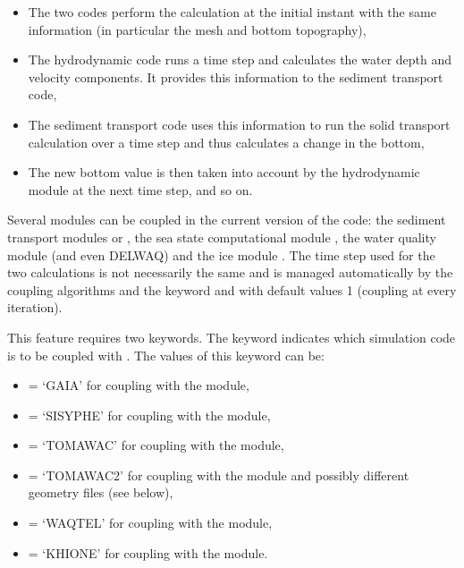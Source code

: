 \begin{itemize}
\item The two codes perform the calculation at the initial instant
with the same information (in particular the mesh and bottom topography),

\item The hydrodynamic code runs a time step and calculates the water depth
and velocity components.
It provides this information to the sediment transport code,

\item The sediment transport code uses this information to run the solid
transport calculation over a time step and thus calculates a change in the
bottom,

\item The new bottom value is then taken into account by the hydrodynamic module
at the next time step, and so on.
\end{itemize}

Several modules can be coupled in the current version of the code:
the sediment transport modules \gaia or \sisyphe,
the sea state computational module \tomawac,
the water quality module \waqtel (and even DELWAQ)
and the ice module \khione.
The time step used for the two calculations is not necessarily the same and is
managed automatically by the coupling algorithms
and the keyword  and
 with default values 1
(coupling at every iteration).

This feature requires two keywords.
The keyword  indicates which simulation code is to be
coupled with .
The values of this keyword can be:

\begin{itemize}
\item {} = `GAIA' for coupling with the \gaia module,

\item {} = `SISYPHE' for coupling with the \sisyphe module,

\item {} = `TOMAWAC' for coupling with the \tomawac module,

\item {} = `TOMAWAC2' for coupling with the \tomawac module
and possibly different geometry files (see below),

\item {} = `WAQTEL' for coupling with the \waqtel module,

\item {} = `KHIONE' for coupling with the \khione module.

\end{itemize}

